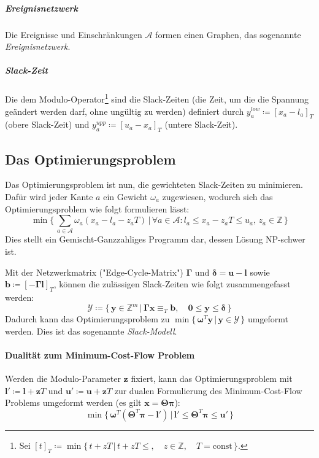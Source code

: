 \documentclass[a4paper, 10pt, twocolumn]{scrartcl}
\newcommand{\const}{\ensuremath{\textrm{const}}}
\newcommand{\Z}{\ensuremath{\mathbb{Z}}}
\newcommand{\mat}[1]{\boldsymbol{#1}}
\renewcommand{\vec}[1]{\boldsymbol{#1}}
\begin{document}
		\subparagraph{Ereignisnetzwerk}
		Die Ereignisse und Einschränkungen \( \mathcal{A} \) formen einen Graphen, das sogenannte \emph{Ereignisnetzwerk}.
		
		\subparagraph{Slack-Zeit}
		Die dem Modulo-Operator\footnote{Sei \( [t]_T \coloneqq \min \{\, t + zT \,\vert\, t + zT \leq,\quad z \in \Z,\quad T = \const \,\} \).} sind die Slack-Zeiten (die Zeit, um die die Spannung geändert werden darf, ohne ungültig zu werden) definiert durch \( y_a^\mathit{low} \coloneqq [x_a - l_a]_T \) (obere Slack-Zeit) und \( y_a^\mathit{upp} \coloneqq [u_a - x_a]_T \) (untere Slack-Zeit).
		
	\subsection*{Das Optimierungsproblem}
		Das Optimierungsproblem ist nun, die gewichteten Slack-Zeiten zu minimieren. Dafür wird jeder Kante \( a \) ein Gewicht \( \omega_a \) zugewiesen, wodurch sich das Optimierungsproblem wie folgt formulieren lässt:
		{\small
		\begin{equation*}
			\min \Bigg\{\, \sum_{a \in \mathcal{A}} \omega_a (x_a - l_a - z_a T) \,\bigg\vert\, \forall a \in \mathcal{A} : l_a \leq x_a - z_a T \leq u_a,\, z_a \in \Z \,\Bigg\}
		\end{equation*}}
		Dies stellt ein Gemischt-Ganzzahliges Programm dar, dessen Lösung NP-schwer ist.
		
		Mit der Netzwerkmatrix ("Edge-Cycle-Matrix") \( \mat{\Gamma} \) und \( \vec{\delta} = \vec{u} - \vec{l} \) sowie \( \vec{b} \coloneqq [-\mat{\Gamma} \vec{l}]_T \), können die zulässigen Slack-Zeiten wie folgt zusammengefasst werden:
		\begin{equation*}
			\mathcal{Y} \coloneqq \big\{\, \vec{y} \in \Z^m \,\vert\, \mat{\Gamma} \vec{x} \equiv_T \vec{b},\quad \vec{0} \leq \vec{y} \leq \vec{\delta} \,\big\}
		\end{equation*}
		Dadurch kann das Optimierungsproblem zu \( \min \big\{\, \vec{\omega}^T \vec{y} \,\vert\, \vec{y} \in \mathcal{Y} \,\big\} \) umgeformt werden. Dies ist das sogenannte \emph{Slack-Modell}.
		
		\paragraph{Dualität zum Minimum-Cost-Flow Problem}
			Werden die Modulo-Parameter \( \vec{z} \) fixiert, kann das Optimierungsproblem mit \( \vec{l}' \coloneqq \vec{l} + \vec{z}T \) und \( \vec{u}' \coloneqq \vec{u} + \vec{z}T \) zur dualen Formulierung des Minimum-Cost-Flow Problems umgeformt werden (es gilt \( \vec{x} = \mat{\Theta} \vec{\pi} \)):
			\begin{equation*}
				\min \big\{\, \vec{\omega}^T (\mat{\Theta}^T \vec{\pi} - \vec{l}') \,\vert\, \vec{l}' \leq \mat{\Theta}^T \vec{\pi} \leq \vec{u}' \,\big\}
			\end{equation*}
			
\end{document}

